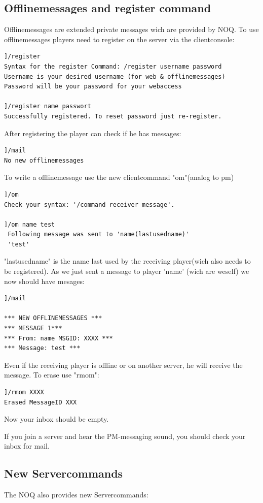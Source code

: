 \documentclass[12pt,a4paper]{article}
\begin{document}
\subsection{Offlinemessages and register command}
Offlinemessages are extended private messages wich are provided by NOQ.
To use offlinemessages players need to register on the server via the clientconsole:
\\
\begin{lstlisting}
]/register
Syntax for the register Command: /register username password
Username is your desired username (for web & offlinemessages)
Password will be your password for your webaccess

]/register name passwort
Successfully registered. To reset password just re-register.
\end{lstlisting}
After registering the player can check if he has messages:
\\
\begin{lstlisting}
]/mail
No new offlinemessages
\end{lstlisting}

To write a offlinemessage use the new clientcommand "om"(analog to pm)
\begin{lstlisting}
]/om
Check your syntax: '/command receiver message'.

]/om name test
 Following message was sent to 'name(lastusedname)'
 'test'
\end{lstlisting}
"lastusedname" is the name last used by the receiving player(wich also needs to be registered).
As we just sent a message to player 'name' (wich are weself) we now should have mesages:
\\
\begin{lstlisting}
]/mail

*** NEW OFFLINEMESSAGES ***
*** MESSAGE 1***
*** From: name MSGID: XXXX ***
*** Message: test ***
\end{lstlisting}
Even if the receiving player is offline or on another server, he will receive the message.
To erase use "rmom":
\\
\begin{lstlisting}
]/rmom XXXX
Erased MessageID XXX
\end{lstlisting}
Now your inbox should be empty.

If you join a server and hear the PM-messaging sound, you should check your inbox for mail.


\subsection{New Servercommands}
The NOQ also provides new Servercommands:
\end{document}
